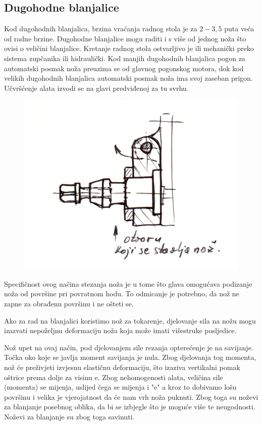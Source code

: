 \documentclass[a4paper,12pt]{article}
\numberwithin{figure}{section}
\begin{document}
\subsection{Dugohodne blanjalice}
Kod dugohodnih blanjalica, brzina vraćanja radnog stola je  za $2 -3,5$ puta veća od radne brzine. Dugohodne blanjalice mogu raditi i s više od jednog noža što ovisi o veličini blanjalice. Kretanje radnog stola ostvarljivo je ili mehanički preko sistema zupčanika ili hidraulički. Kod manjih dugohodnih blanjalica pogon za automatski posmak noža preuzima se od glavnog pogonskog motora, dok kod velikih dugohodnih blanjalica automatski posmak noža ima svoj zaseban prigon. Učvršćenje alata izvodi se na glavi predviđenoj za tu svrhu.
\begin{figure}[!h]
\centering
\includegraphics[scale=0.15]{image_16-1.png}
\end{figure}
\FloatBarrier
Specifičnost ovog načina stezanja noža je u tome što glava omogućava podizanje noža od površine pri povratnom hodu. To odmicanje je potrebno, da nož ne zapne za obrađenu površinu i ne ošteti se.\par 
Ako za rad na blanjalici koristimo nož za tokarenje, djelovanje sila na nožu mogu izazvati nepoželjnu deformaciju noža koja može imati višestruke posljedice. \par
Nož upet na ovaj način, pod djelovanjem sile rezanja opterećenje je na savijanje. Točka oko koje se javlja moment savijanja je nula. Zbog djelovanja tog momenta, nož će preživjeti izvjesnu elastičnu deformaciju, što izaziva vertikalni pomak oštrice prema dolje za visinu e. Zbog nehomogenosti alata, veličina sile (momenta) se mijenja, uslijed čega se mijenja i "e" a kroz to dobivamo lošu površinu i velika je vjerojatnost da će nam vrh noža puknuti. Zbog toga su noževi za blanjanje posebnog oblika, da bi se izbjegle što je moguće više te neugodnosti. Noževi za blanjanje su zbog toga savinuti.
\end{document}
